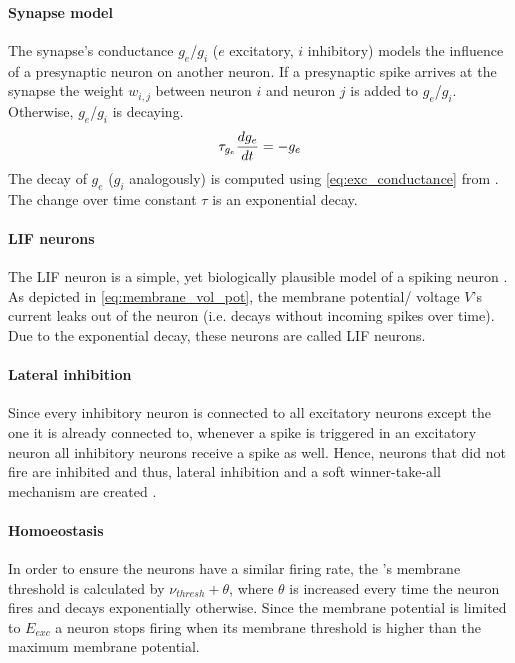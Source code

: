 \paragraph{\textbf{Synapse model}}
The synapse's conductance $g_e$/$g_i$ ($e$ excitatory, $i$ inhibitory) models the influence of a presynaptic neuron on another neuron.
If a presynaptic spike arrives at the synapse the weight $w_{i,j}$ between neuron $i$ and neuron $j$ is added to $g_e$/$g_i$.
Otherwise, $g_e$/$g_i$ is decaying.
%
\begin{equation}
    \centering
    \label{eq:exc_conductance}
    \tau_{g_e} \frac{dg_e}{dt} = - g_e
\end{equation}
%
The decay of $g_e$ ($g_i$ analogously) is computed using \autoref{eq:exc_conductance} from \cite{SNN}.
The change over time constant $\tau$ is an exponential decay.


\paragraph{\textbf{\ac{LIF} neurons}}
The \ac{LIF} neuron is a simple, yet biologically plausible model of a spiking neuron \cite{RBM_SNN}.
As depicted in \autoref{eq:membrane_vol_pot}, the membrane potential/ voltage $V$'s current leaks out of the neuron 
(i.e. decays without incoming spikes over time).
Due to the exponential decay, these neurons are called \ac{LIF} neurons.


\paragraph{\textbf{Lateral inhibition}}
Since every inhibitory neuron is connected to all excitatory neurons except the one it is already connected to, 
whenever a spike is triggered in an excitatory neuron all inhibitory neurons receive a spike as well.
Hence, neurons that did not fire are inhibited and thus, lateral inhibition and a soft winner-take-all mechanism are created \cite{SNN}.


\paragraph{\textbf{Homoeostasis}}
In order to ensure the neurons have a similar firing rate, the \eN{}'s membrane threshold is calculated by $\nu_{thresh} + \theta$, 
where $\theta$ is increased every time the neuron fires and decays exponentially otherwise.
Since the membrane potential is limited to $E_{exc}$ a neuron stops firing when its membrane threshold is higher than the maximum membrane potential.

